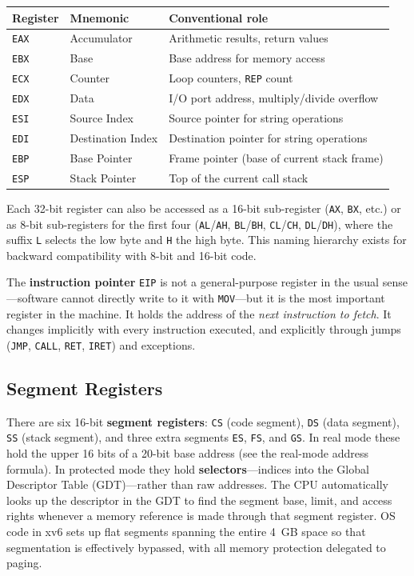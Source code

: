 \documentclass[11pt]{article}
\begin{document}
\begin{center}
\begin{tabular}{lll}
\toprule
\textbf{Register} & \textbf{Mnemonic} & \textbf{Conventional role} \\
\midrule
\texttt{EAX} & Accumulator         & Arithmetic results, return values \\
\texttt{EBX} & Base                & Base address for memory access \\
\texttt{ECX} & Counter             & Loop counters, \texttt{REP} count \\
\texttt{EDX} & Data                & I/O port address, multiply/divide overflow \\
\texttt{ESI} & Source Index        & Source pointer for string operations \\
\texttt{EDI} & Destination Index   & Destination pointer for string operations \\
\texttt{EBP} & Base Pointer        & Frame pointer (base of current stack frame) \\
\texttt{ESP} & Stack Pointer       & Top of the current call stack \\
\bottomrule
\end{tabular}
\end{center}

Each 32-bit register can also be accessed as a 16-bit sub-register (\texttt{AX},
\texttt{BX}, etc.) or as 8-bit sub-registers for the first four (\texttt{AL}/\texttt{AH},
\texttt{BL}/\texttt{BH}, \texttt{CL}/\texttt{CH}, \texttt{DL}/\texttt{DH}), where the suffix
\texttt{L} selects the low byte and \texttt{H} the high byte. This naming hierarchy exists
for backward compatibility with 8-bit and 16-bit code.

The \textbf{instruction pointer} \texttt{EIP} is not a general-purpose register in the usual
sense---software cannot directly write to it with \texttt{MOV}---but it is the most important
register in the machine. It holds the address of the \emph{next instruction to fetch}. It
changes implicitly with every instruction executed, and explicitly through jumps (\texttt{JMP},
\texttt{CALL}, \texttt{RET}, \texttt{IRET}) and exceptions.

\subsection{Segment Registers}

There are six 16-bit \textbf{segment registers}: \texttt{CS} (code segment), \texttt{DS}
(data segment), \texttt{SS} (stack segment), and three extra segments \texttt{ES},
\texttt{FS}, and \texttt{GS}. In real mode these hold the upper 16 bits of a 20-bit base
address (see the real-mode address formula). In protected mode they hold
\textbf{selectors}---indices into the Global Descriptor Table (GDT)---rather than raw
addresses. The CPU automatically looks up the descriptor in the GDT to find the segment
base, limit, and access rights whenever a memory reference is made through that segment
register. OS code in xv6 sets up flat segments spanning the entire 4~GB space so that
segmentation is effectively bypassed, with all memory protection delegated to paging.
\end{document}
